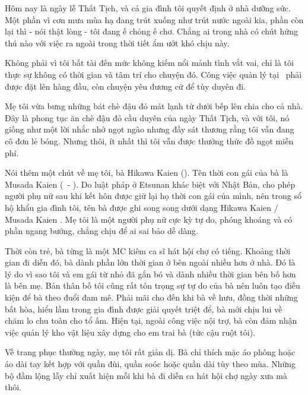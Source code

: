 \documentclass[../main.tex]{subfiles}
\begin{document}
Hôm nay là ngày lễ Thất Tịch, và cả gia đình tôi quyết định ở nhà dưỡng sức. Một phần vì cơn mưa mùa hạ đang trút xuống như trút nước ngoài kia, phần còn lại thì - nói thật lòng - tôi đang ế chỏng ế chơ. Chẳng ai trong nhà có chút hứng thú nào với việc ra ngoài trong thời tiết ẩm ướt khó chịu này.

Không phải vì tôi bất tài đến mức không kiếm nổi mảnh tình vắt vai, chỉ là tôi thực sự không có thời gian và tâm trí cho chuyện đó. Công việc quản lý tại \hll\ phải được đặt lên hàng đầu, còn chuyện yêu đương cứ để tùy duyên đi.

Mẹ tôi vừa bưng những bát chè đậu đỏ mát lạnh từ dưới bếp lên chia cho cả nhà. Đây là phong tục ăn chè đậu đỏ cầu duyên của ngày Thất Tịch, và với tôi, nó giống như một lời nhắc nhở ngọt ngào nhưng đầy sát thương rằng tôi vẫn đang cô đơn lẻ bóng. Nhưng thôi, ít nhất thì tôi vẫn được thưởng thức đồ ngọt miễn phí.

\chrint

Nói thêm một chút về mẹ tôi, bà Hikawa Kaien (). Tên thời con gái của bà là Musada Kaien (\ - ). Do luật pháp ở Etsunan khác biệt với Nhật Bản, cho phép người phụ nữ sau khi kết hôn được giữ lại họ thời con gái của mình, nên trong sổ hộ khẩu gia đình tôi, tên bà được ghi song song dưới dạng Hikawa Kaien / Musada Kaien . Mẹ tôi là một người phụ nữ cực kỳ tự do, phóng khoáng và có phần ngang bướng, chẳng chịu để ai sai bảo dễ dàng.

Thời còn trẻ, bà từng là một MC kiêm ca sĩ hát hội chợ có tiếng. Khoảng thời gian đi diễn đó, bà dành phần lớn thời gian ở bên ngoài nhiều hơn ở nhà. Đó là lý do vì sao tôi và em gái từ nhỏ đã gắn bó và dành nhiều thời gian bên bố hơn là bên mẹ. Bản thân bố tôi cũng rất tôn trọng sự tự do của bà nên luôn tạo điều kiện để bà theo đuổi đam mê. Phải mãi cho đến khi bà về hưu, đồng thời những bất hòa, hiểu lầm trong gia đình được giải quyết triệt để, bà mới chịu lui về chăm lo chu toàn cho tổ ấm. Hiện tại, ngoài công việc nội trợ, bà còn đảm nhận việc quản lý kho vật liệu xây dựng cho em trai bà (tức cậu ruột tôi).

Về trang phục thường ngày, mẹ tôi rất giản dị. Bà chỉ thích mặc áo phông hoặc áo dài tay kết hợp với quần đùi, quần soóc hoặc quần dài tùy theo mùa. Những bộ đầm lộng lẫy chỉ xuất hiện mỗi khi bà đi diễn ca hát hội chợ ngày xưa mà thôi.

\chrint
\end{document}
